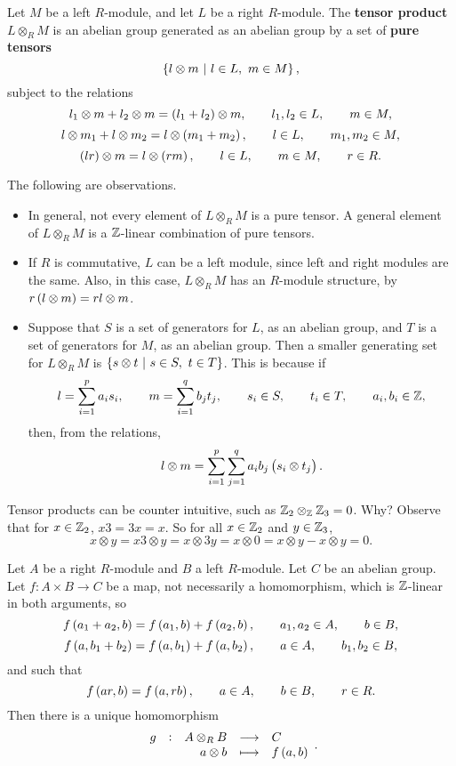 \begin{definition}
Let $ M $ be a left $ R $-module, and let $ L $ be a right $ R $-module. The \textbf{tensor product} $ L \otimes_R M $ is an abelian group generated as an abelian group by a set of \textbf{pure tensors}
$$ \cbr{l \otimes m \st l \in L, \ m \in M}, $$
subject to the relations
$$ l_1 \otimes m + l_2 \otimes m = \br{l_1 + l_2} \otimes m, \qquad l_1, l_2 \in L, \qquad m \in M, $$
$$ l \otimes m_1 + l \otimes m_2 = l \otimes \br{m_1 + m_2}, \qquad l \in L, \qquad m_1, m_2 \in M, $$
$$ \br{lr} \otimes m = l \otimes \br{rm}, \qquad l \in L, \qquad m \in M, \qquad r \in R. $$
\end{definition}

The following are observations.
\begin{itemize}
\item In general, not every element of $ L \otimes_R M $ is a pure tensor. A general element of $ L \otimes_R M $ is a $ \mathbb{Z} $-linear combination of pure tensors.
\item If $ R $ is commutative, $ L $ can be a left module, since left and right modules are the same. Also, in this case, $ L \otimes_R M $ has an $ R $-module structure, by $ r\br{l \otimes m} = rl \otimes m $.
\item Suppose that $ S $ is a set of generators for $ L $, as an abelian group, and $ T $ is a set of generators for $ M $, as an abelian group. Then a smaller generating set for $ L \otimes_R M $ is $ \cbr{s \otimes t \st s \in S, \ t \in T} $. This is because if
$$ l = \sum_{i = 1}^p a_is_i, \qquad m = \sum_{i = 1}^q b_jt_j, \qquad s_i \in S, \qquad t_i \in T, \qquad a_i, b_i \in \mathbb{Z}, $$
then, from the relations,
$$ l \otimes m = \sum_{i = 1}^p \sum_{j = 1}^q a_ib_j\br{s_i \otimes t_j}. $$
\end{itemize}

\pagebreak

\begin{example*}
Tensor products can be counter intuitive, such as $ \mathbb{Z}_2 \otimes_{\mathbb{Z}} \mathbb{Z}_3 = 0 $. Why? Observe that for $ x \in \mathbb{Z}_2 $, $ x3 = 3x = x $. So for all $ x \in \mathbb{Z}_2 $ and $ y \in \mathbb{Z}_3 $,
$$ x \otimes y = x3 \otimes y = x \otimes 3y = x \otimes 0 = x \otimes y - x \otimes y = 0. $$
\end{example*}


\begin{theorem}
Let $ A $ be a right $ R $-module and $ B $ a left $ R $-module. Let $ C $ be an abelian group. Let $ f : A \times B \to C $ be a map, not necessarily a homomorphism, which is $ \mathbb{Z} $-linear in both arguments, so
$$ f\br{a_1 + a_2, b} = f\br{a_1, b} + f\br{a_2, b}, \qquad a_1, a_2 \in A, \qquad b \in B, $$
$$ f\br{a, b_1 + b_2} = f\br{a, b_1} + f\br{a, b_2}, \qquad a \in A, \qquad b_1, b_2 \in B, $$
and such that
$$ f\br{ar, b} = f\br{a, rb}, \qquad a \in A, \qquad b \in B, \qquad r \in R. $$
Then there is a unique homomorphism
$$ \function[g]{A \otimes_R B}{C}{a \otimes b}{f\br{a, b}}. $$
\end{theorem}

